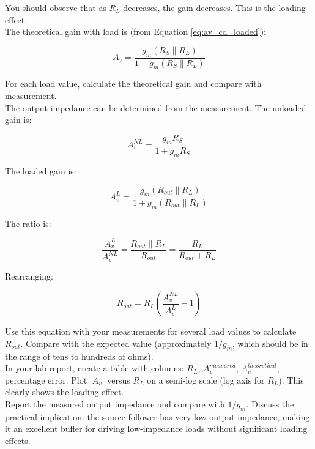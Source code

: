 \documentclass[10pt]{article}
\begin{document}
You should observe that as $R_L$ decreases, the gain decreases.  This is the loading effect. \\

The theoretical gain with load is (from Equation \ref{eq:av_cd_loaded}):

\begin{equation}
    A_v = \frac{g_m (R_S \parallel R_L)}{1 + g_m (R_S \parallel R_L)}
\end{equation}

For each load value, calculate the theoretical gain and compare with measurement.\\

The output impedance can be determined from the measurement. The unloaded gain is:

\begin{equation}
    A_v^{NL} = \frac{g_m R_S}{1 + g_m R_S}
\end{equation}

The loaded gain is:

\begin{equation}
    A_v^{L} = \frac{g_m (R_{out} \parallel R_L)}{1 + g_m (R_{out} \parallel R_L)}
\end{equation}

The ratio is:

\begin{equation}
    \frac{A_v^{L}}{A_v^{NL}} = \frac{R_{out} \parallel R_L}{R_{out}} = \frac{R_L}{R_{out} + R_L}
\end{equation}

Rearranging:

\begin{equation}
    R_{out} = R_L \left( \frac{A_v^{NL}}{A_v^{L}} - 1 \right)
\end{equation}

Use this equation with your measurements for several load values to calculate $R_{out}$. Compare with the expected value (approximately $1/g_m$, which should be in the range of tens to hundreds of ohms). \\

In your lab report, create a table with columns:  $R_L$, $A_v^{measured}$, $A_v^{theoretical}$, percentage error.  Plot $|A_v|$ versus $R_L$ on a semi-log scale (log axis for $R_L$). This clearly shows the loading effect. \\

Report the measured output impedance and compare with $1/g_m$. Discuss the practical implication:  the source follower has very low output impedance, making it an excellent buffer for driving low-impedance loads without significant loading effects.\\
\end{document}
